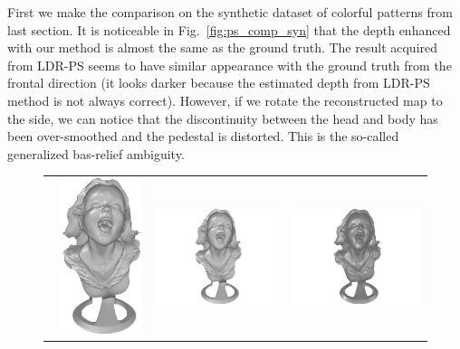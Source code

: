 First we make the comparison on the synthetic dataset of colorful patterns from last section.
It is noticeable in Fig.~\ref{fig:ps_comp_syn} that the depth enhanced with our method is almost the same as the ground truth.
The result acquired from LDR-PS seems to have similar appearance with the ground truth from the frontal direction (it looks darker because the estimated depth from LDR-PS method is not always correct).
However, if we rotate the reconstructed map to the side, we can notice that the discontinuity between the head and body has been over-smoothed and the pedestal is distorted.
This is the so-called generalized bas-relief ambiguity.

\begin{figure}[H]
\centering
\setlength{\tabcolsep}{0.1em} %
 {\renewcommand{\arraystretch}{1.6}%
\begin{tabular}{c c c c}
   \multirow{-6}{*}{\parbox[t]{2.5mm}{}} &    
   \includegraphics[height = 0.24\linewidth]{figures/result/comp_gt_shape.pdf} 
   &
   \includegraphics[height = 0.24\linewidth]{figures/result/ps2_robust_front.pdf} &
   \includegraphics[height = 0.24\linewidth]{figures/result/ps2_LDR_front.pdf} \\


\end{tabular}}
\end{figure}
